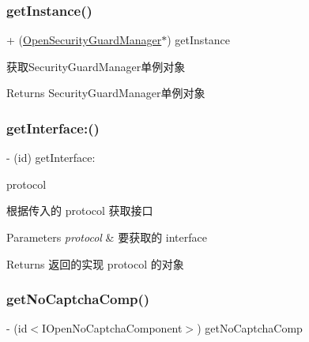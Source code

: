 \subsubsection{\texorpdfstring{get\+Instance()}{getInstance()}}
{\footnotesize\ttfamily + (\mbox{\hyperlink{interface_open_security_guard_manager}{Open\+Security\+Guard\+Manager}}$\ast$) get\+Instance \begin{DoxyParamCaption}{ }\end{DoxyParamCaption}}

获取\+Security\+Guard\+Manager单例对象

\begin{DoxyReturn}{Returns}
Security\+Guard\+Manager单例对象 
\end{DoxyReturn}
\mbox{\label{interface_open_security_guard_manager_adf4c50e3c51091d3f4fdfbd5e45ebc38}} 
\subsubsection{\texorpdfstring{get\+Interface\+:()}{getInterface:()}}
{\footnotesize\ttfamily -\/ (id) get\+Interface\+: \begin{DoxyParamCaption}\item[{(Protocol $\ast$)}]{protocol }\end{DoxyParamCaption}}

根据传入的 protocol 获取接口


\begin{DoxyParams}{Parameters}
{\em protocol} & 要获取的 interface\\
\hline
\end{DoxyParams}
\begin{DoxyReturn}{Returns}
返回的实现 protocol 的对象 
\end{DoxyReturn}
\mbox{\label{interface_open_security_guard_manager_afa2af267e86bbd49b231cfc8018360c5}} 
\subsubsection{\texorpdfstring{get\+No\+Captcha\+Comp()}{getNoCaptchaComp()}}
{\footnotesize\ttfamily -\/ (id$<$I\+Open\+No\+Captcha\+Component$>$) get\+No\+Captcha\+Comp \begin{DoxyParamCaption}{ }\end{DoxyParamCaption}}

